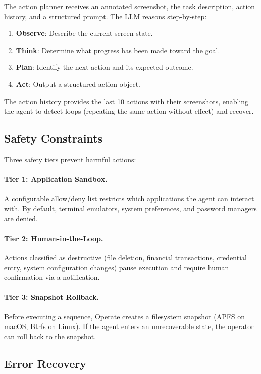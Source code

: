 \documentclass[11pt,twocolumn]{article}
\begin{document}
The action planner receives an annotated screenshot, the task description, action history, and a structured prompt. The LLM reasons step-by-step:

\begin{enumerate}
    \item \textbf{Observe}: Describe the current screen state.
    \item \textbf{Think}: Determine what progress has been made toward the goal.
    \item \textbf{Plan}: Identify the next action and its expected outcome.
    \item \textbf{Act}: Output a structured action object.
\end{enumerate}

The action history provides the last 10 actions with their screenshots, enabling the agent to detect loops (repeating the same action without effect) and recover.

\subsection{Safety Constraints}

Three safety tiers prevent harmful actions:

\paragraph{Tier 1: Application Sandbox.} A configurable allow/deny list restricts which applications the agent can interact with. By default, terminal emulators, system preferences, and password managers are denied.

\paragraph{Tier 2: Human-in-the-Loop.} Actions classified as destructive (file deletion, financial transactions, credential entry, system configuration changes) pause execution and require human confirmation via a notification.

\paragraph{Tier 3: Snapshot Rollback.} Before executing a sequence, Operate creates a filesystem snapshot (APFS on macOS, Btrfs on Linux). If the agent enters an unrecoverable state, the operator can roll back to the snapshot.

\subsection{Error Recovery}
\end{document}

